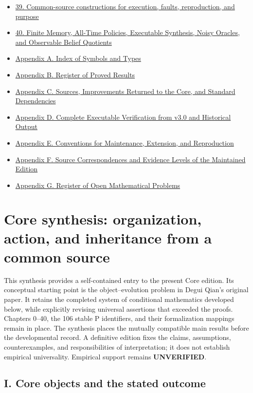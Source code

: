 \documentclass[
  english,
  11pt,
  oneside]{book}
\begin{document}
\begin{itemize}
  \hyperref[ch-38]{38. From Registered Sampling to Actual Joint Risk After Data-Dependent Selection}
\item
  \hyperref[ch-39]{39. Common-source constructions for execution, faults, reproduction, and purpose}
\item
  \hyperref[ch-40]{40. Finite Memory, All-Time Policies, Executable Synthesis, Noisy Oracles, and Observable Belief Quotients}
\item
  \hyperref[appendix-a]{Appendix A. Index of Symbols and Types}
\item
  \hyperref[appendix-b]{Appendix B. Register of Proved Results}
\item
  \hyperref[appendix-c]{Appendix C. Sources, Improvements Returned to the Core, and Standard Dependencies}
\item
  \hyperref[appendix-d]{Appendix D. Complete Executable Verification from v3.0 and Historical Output}
\item
  \hyperref[appendix-e]{Appendix E. Conventions for Maintenance, Extension, and Reproduction}
\item
  \hyperref[appendix-f]{Appendix F. Source Correspondences and Evidence Levels of the Maintained Edition}
\item
  \hyperref[appendix-g]{Appendix G. Register of Open Mathematical Problems}
\end{itemize}

\chapter{Core synthesis: organization, action, and inheritance from a common source}\label{core-theory}

This synthesis provides a self-contained entry to the present Core edition. Its conceptual starting point is the object--evolution problem in Degui Qian's original paper. It retains the completed system of conditional mathematics developed below, while explicitly revising universal assertions that exceeded the proofs. Chapters 0--40, the 106 stable P identifiers, and their formalization mappings remain in place. The synthesis places the mutually compatible main results before the developmental record. A definitive edition fixes the claims, assumptions, counterexamples, and responsibilities of interpretation; it does not establish empirical universality. Empirical support remains \textbf{UNVERIFIED}.

\section{I. Core objects and the stated outcome}\label{i.-core-objects-and-the-stated-outcome}
\end{document}
